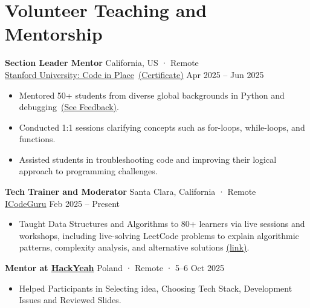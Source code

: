 \documentclass[a4paper,12pt]{article}
\begin{document}
\section{Volunteer Teaching and Mentorship}

\textbf{Section Leader Mentor} \hfill California, US · Remote \\
\href{https://codeinplace.stanford.edu/}{Stanford University: Code in Place}~\href{https://digitalcredential.stanford.edu/check/FA458483850B4B635DD0915130CCBEBF00F195AFCBF6991EE7448725533BAAB2LzFqZHI1YU9SSmVRZFpMQjVXV0xjdkxuWktYOExkU2RBZE85SFF6YmlPZGZLZDA0}{(Certificate)} \hfill Apr 2025 -- Jun 2025
\begin{itemize}[leftmargin=*]
    \item Mentored 50+ students from diverse global backgrounds in Python and debugging~\href{https://media.licdn.com/dms/image/v2/D4D2DAQH_89FutFda4w/profile-treasury-image-shrink_8192_8192/B4DZfE6yljGUAg-/0/1751355439025?e=1756393200&v=beta&t=n1DErPPd6YfASzT0V4SyNly1bj7Gohi6x4FmvWfIecI}{(See Feedback)}.
    \item Conducted 1:1 sessions clarifying concepts such as for-loops, while-loops, and functions.
    \item Assisted students in troubleshooting code and improving their logical approach to programming challenges.
\end{itemize}

\vspace{0.5em}

\textbf{Tech Trainer and Moderator} \hfill Santa Clara, California · Remote \\
\href{https://icode.guru/}{ICodeGuru} \hfill Feb 2025 -- Present
\begin{itemize}[leftmargin=*]
    \item Taught Data Structures and Algorithms to 80+ learners via live sessions and workshops, including live-solving LeetCode problems to explain algorithmic patterns, complexity analysis, and alternative solutions \href{https://github.com/Qasim-Gill/Volunteer-Teaching-and-Mentorship}{(link)}.
\end{itemize}

\vspace{0.5em}

\textbf{Mentor at \href{https://2025.hackyeah.pl/bio_mentor_2025/\#id=60630}{HackYeah}} \hfill Poland · Remote · 5–6 Oct 2025
\begin{itemize}[leftmargin=*]
    \item Helped Participants in Selecting idea, Choosing Tech Stack, Development Issues and Reviewed Slides.
\end{itemize}
\end{document}
